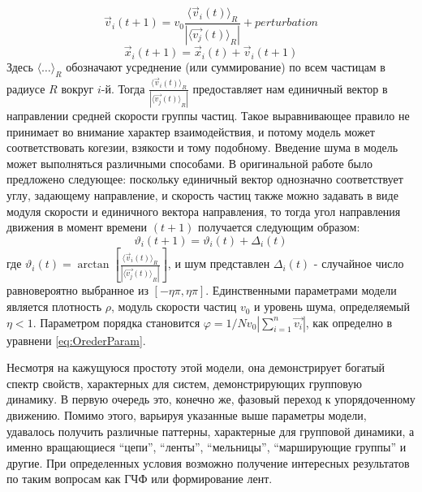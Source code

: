     \begin{equation}
        \vec{v}_i(t+1) = v_0 \frac{{\langle \vec{v}_i(t) \rangle}_R}{|{\langle \vec{v_j}(t) \rangle}_R|} + perturbation
    \end{equation}
    \begin{equation}
        \vec{x}_i(t+1) = \vec{x}_i(t)+\vec{v}_i(t+1)
    \end{equation}
    Здесь ${\langle \dots \rangle}_R$ обозначают усреднение (или суммирование) по всем частицам в радиусе $R$ вокруг $i$-й. Тогда $ \frac{{\langle \vec{v}_i(t) \rangle}_R}{|{\langle \vec{v_j}(t) \rangle}_R|}$ предоставляет нам единичный вектор в направлении средней скорости группы частиц. Такое выравнивающее правило не принимает во внимание характер взаимодействия, и потому модель может соответствовать когезии, взякости и тому подобному. Введение шума в модель может выполняться различными способами. В оригинальной работе было предложено следующее: поскольку единичный вектор однозначно соответствует углу, задающему направление, и скорость частиц также можно задавать в виде модуля скорости и единичного вектора направления, то тогда угол направления движения в момент времени $(t+1)$ получается следующим образом:
    \begin{equation}
        \vartheta_i (t+1) = \vartheta_i(t) + \Delta_i(t)
    \end{equation}
    где $\vartheta_i(t) = \arctan [{\frac{{\langle \vec{v}_i(t) \rangle}_R}{|{\langle \vec{v_j}(t) \rangle}_R|}}]$, и шум представлен $\Delta_i(t)$ - случайное число равновероятно выбранное из $[-\eta \pi,\eta \pi]$. Единственными параметрами модели является плотность $\rho$, модуль скорости частиц $v_0$ и уровень шума, определяемый $\eta < 1$. Параметром порядка становится 
    $\varphi = 1/{N v_0} |{\sum\limits_{i=1}^n \vec{v_i}}|$, как определно в уравнени \ref{eq:OrederParam}.

    Несмотря на кажущуюся простоту этой модели, она демонстрирует богатый спектр свойств, характерных для систем, демонстрирующих групповую динамику. В первую очередь это, конечно же, фазовый переход к упорядоченному движению. Помимо этого, варьируя указанные выше параметры модели, удавалось получить различные паттерны, характерные для групповой динамики, а именно вращающиеся ``цепи'', ``ленты'', ``мельницы'', ``марширующие группы'' и другие. При определенных условия возможно получение интересных результатов по таким вопросам как ГЧФ или формирование лент.

